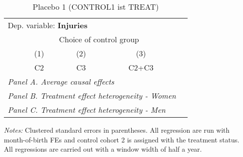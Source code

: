  \begin{table}[H] \centering \begin{threeparttable} \caption{Placebo 1 (CONTROL1 ist TREAT) } {\def\sym#1{\ifmmode^{#1}\else\(^{#1}\)\fi} \begin{tabular}{l*{4}{c}} \toprule \multicolumn{4}{l}{Dep. variable: \textbf{Injuries}} \\ & \multicolumn{3}{c}{Choice of control group} \\ \cmidrule(lr){2-4}
            &\multicolumn{1}{c}{(1)}&\multicolumn{1}{c}{(2)}&\multicolumn{1}{c}{(3)}\\
            &\multicolumn{1}{c}{C2}&\multicolumn{1}{c}{C3}&\multicolumn{1}{c}{C2+C3}\\
\midrule
 \multicolumn{4}{l}{\emph{Panel A. Average causal effects}} \\      \midrule\multicolumn{4}{l}{\emph{Panel B. Treatment effect heterogeneity - Women}} \\      \midrule\multicolumn{4}{l}{\emph{Panel C. Treatment effect heterogeneity - Men}} \\      
\bottomrule \end{tabular} } \begin{tablenotes} \item \scriptsize \emph{Notes:} Clustered standard errors in parentheses. All regression are run with month-of-birth FEs and control cohort 2 is assigned with the treatment status. All regressions are carried out with a window width of half a year. \end{tablenotes} \end{threeparttable} \end{table} 

